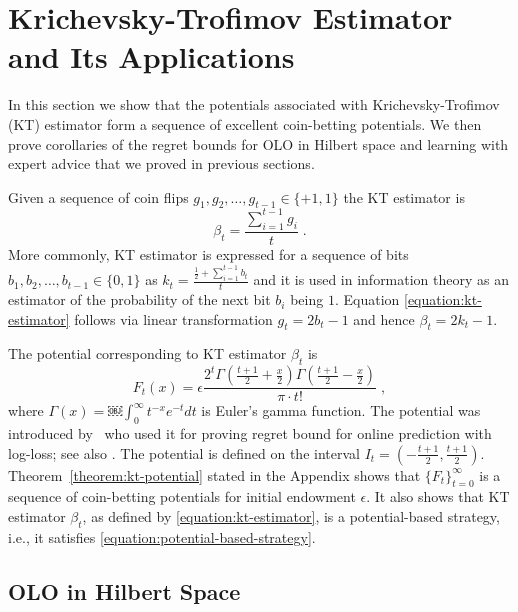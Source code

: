 \section{Krichevsky-Trofimov Estimator and Its Applications}
\label{section:kt-estimator}

In this section we show that the potentials associated with Krichevsky-Trofimov
(KT) estimator form a sequence of excellent coin-betting potentials. We then
prove corollaries of the regret bounds for OLO in Hilbert space and learning
with expert advice that we proved in previous sections.

Given a sequence of coin flips $g_1, g_2, \dots, g_{t-1} \in \{+1,1\}$
the KT estimator is
\begin{equation}
\label{equation:kt-estimator}
\beta_t = \frac{\sum_{i=1}^{t-1} g_i}{t} \; .
\end{equation}
More commonly, KT estimator is expressed for a sequence of bits $b_1, b_2,
\dots, b_{t-1} \in \{0,1\}$ as $k_t = \frac{\frac{1}{2} + \sum_{i=1}^{t-1}
b_t}{t}$ and it is used in information theory as an estimator
of the probability of the next bit $b_i$ being $1$. Equation
\eqref{equation:kt-estimator} follows via linear transformation $g_t = 2b_t - 1$
and hence $\beta_t = 2k_t - 1$.

The potential corresponding to KT estimator $\beta_t$ is
\begin{equation}
\label{equation:kt-estimator-potential}
F_t(x) = \epsilon \frac{2^t \Gamma(\frac{t+1}{2} + \frac{x}{2}) \Gamma(\frac{t+1}{2} - \frac{x}{2})}{\pi \cdot t!} \; ,
\end{equation}
where $\Gamma(x) = ￼\int_0^\infty t^{-x} e^{-t} dt$ is Euler's gamma function.
The potential was introduced by~\citet{KrichevskyT81} who used it for proving
regret bound for online prediction with log-loss; see also \cite[Section 9.7]{Cesa-BianchiL06}.
The potential is defined on the interval $I_t = (-\frac{t+1}{2},
\frac{t+1}{2})$. Theorem~\ref{theorem:kt-potential} stated in the Appendix shows
that $\{F_t\}_{t=0}^\infty$ is a sequence of coin-betting potentials for initial
endowment $\epsilon$. It also shows that KT estimator $\beta_t$, as defined by
\eqref{equation:kt-estimator}, is a potential-based strategy, i.e., it satisfies
\eqref{equation:potential-based-strategy}.

\subsection{OLO in Hilbert Space}

